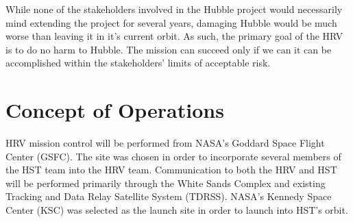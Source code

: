 \documentclass[onecolumn,10pt]{jhwhw}
\begin{document}
While none of the stakeholders involved in the Hubble project would necessarily mind extending the project for several years, damaging Hubble would be much worse than leaving it in it's current orbit. As such, the primary goal of the HRV is to do no harm to Hubble. The mission can succeed only if we can it can be accomplished within the stakeholders' limits of acceptable risk.








\section{Concept of Operations}
HRV mission control will be performed from NASA's Goddard Space Flight Center (GSFC). The site was chosen in order to incorporate several members of the HST team into the HRV team. Communication to both the HRV and HST will be performed primarily through the White Sands Complex and existing Tracking and Data Relay Satellite System (TDRSS). NASA's Kennedy Space Center (KSC) was selected as the launch site in order to launch into HST's orbit.
\end{document}
